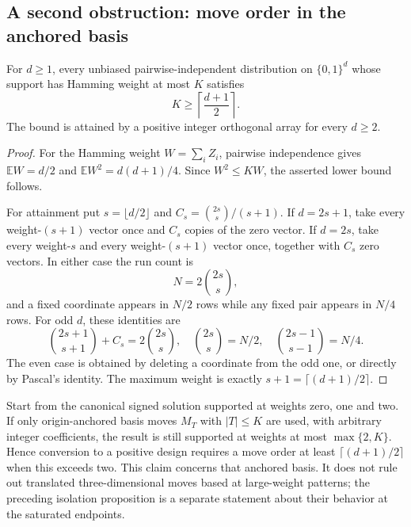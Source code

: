 \subsection{A second obstruction: move order in the anchored basis}
\begin{proposition}
For $d\ge1$, every unbiased pairwise-independent distribution on $\{0,1\}^d$ whose
support has Hamming weight at most $K$ satisfies
\[
 K\ge\left\lceil\frac{d+1}{2}\right\rceil.
\]
The bound is attained by a positive integer orthogonal array for every
$d\ge2$.
\end{proposition}
\begin{proof}
For the Hamming weight $W=\sum_i Z_i$, pairwise independence gives
$\mathbb EW=d/2$ and $\mathbb EW^2=d(d+1)/4$. Since $W^2\le KW$,
the asserted lower bound follows.

For attainment put $s=\lfloor d/2\rfloor$ and
$C_s=\binom{2s}{s}/(s+1)$. If $d=2s+1$, take every weight-$(s+1)$
vector once and $C_s$ copies of the zero vector. If $d=2s$, take every
weight-$s$ and every weight-$(s+1)$ vector once, together with $C_s$
zero vectors. In either case the run count is
\[
 N=2\binom{2s}{s},
\]
and a fixed coordinate appears in $N/2$ rows while any fixed pair
appears in $N/4$ rows. For odd $d$, these identities are
\[
 \binom{2s+1}{s+1}+C_s=2\binom{2s}{s},\quad
 \binom{2s}{s}=N/2,\quad
 \binom{2s-1}{s-1}=N/4.
\]
The even case is obtained by deleting a coordinate from the odd one,
or directly by Pascal's identity. The maximum weight is exactly
$s+1=\lceil(d+1)/2\rceil$.
\end{proof}

Start from the canonical signed solution supported at weights zero,
one and two. If only origin-anchored basis moves $M_T$ with $|T|\le K$
are used, with arbitrary integer coefficients, the result is still
supported at weights at most $\max\{2,K\}$. Hence conversion to a positive
design requires a move order at least $\lceil(d+1)/2\rceil$ when this
exceeds two. This claim concerns that anchored basis. It does not rule
out translated three-dimensional moves based at large-weight patterns;
the preceding isolation proposition is a separate statement about their
behavior at the saturated endpoints.

